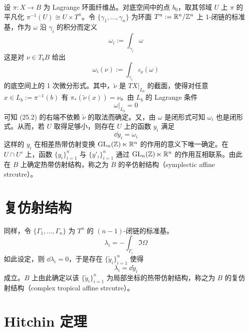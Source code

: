 设 $\pi: X \to B$ 为 Lagrange 环面纤维丛。对底空间中的点 $b_0$，取其邻域 $U$ 上 $\pi$ 的平凡化 $\pi^{-1}(U) \cong U\times T^n$。令 $\{\gamma_1,\dots,\gamma_n\}$ 为环面 $T^n := \mathbb{R}^n/\mathbb{Z}^n$ 上 1-闭链的标准基，作为 $\omega$ 沿 $\gamma_i$ 的积分而定义
\begin{equation}
  \omega_i := \int_{\gamma_i}\omega \tag{25.1}
\end{equation}
这是对 $\nu \in T_bB$ 给出
\begin{equation}
  \omega_i(\nu) := \int_{\gamma_i}\iota_{\tilde\nu}(\omega) \tag{25.2}
\end{equation}
的底空间上的 1 次微分形式。其中，$\tilde\nu$ 是 $TX|_{L_b}$ 的截面，使得对任意 $x \in L_b := \pi^{-1}(b)$ 有 $\pi_*(\tilde\nu(x)) = \nu$。由 $L_b$ 的 Lagrange 条件
\begin{equation}
  \omega|_{L_b} = 0 \tag{25.3}
\end{equation}
可知 (25.2) 的右端不依赖 $\tilde\nu$ 的取法而确定。又，由 $\omega$ 是闭形式可知 $\omega_i$ 也是闭形式。从而，若 $U$ 取得足够小，则存在 $U$ 上的函数 $y_i$ 满足
\begin{equation}
  \dd y_i = \omega_i \tag{25.4}
\end{equation}
这样的 $y_i$ 在相差热带仿射变换 $\mathrm{GL}_n(\mathbb{Z})\ltimes\mathbb{R}^n$ 的作用的意义下唯一确定。在 $U\cap U'$ 上，函数 $\{y_i\}_{i=1}^{n}$ 与 $\{y'_i\}_{i=1}^{n}$ 通过 $\mathrm{GL}_n(\mathbb{Z})\ltimes\mathbb{R}^n$ 的作用互相联系。由此在 $B$ 上确定热带仿射结构，称之为 $B$ 的辛仿射结构（symplectic affine strcutre）。


\section{复仿射结构}

同样，令 $\{\Gamma_1,\dots,\Gamma_n\}$ 为 $T^n$ 的 $(n-1)$-闭链的标准基。
\begin{equation}
  \lambda_i = -\int_{\Gamma_i}\Im\Omega \tag{26.1}
\end{equation}
如此设定，则 $\dd\lambda_i = 0$，于是存在 $\{\tilde y_i\}_{i=1}^{n}$ 使得
\begin{equation}
  \lambda_i = \dd\tilde y_i \tag{26.2}
\end{equation}
成立。$B$ 上由此确定以该 $\{\tilde y_i\}_{i=1}^{n}$ 为局部坐标的热带仿射结构，称之为 $B$ 的复仿射结构（complex tropical affine strcutre）。

\section{Hitchin 定理}


